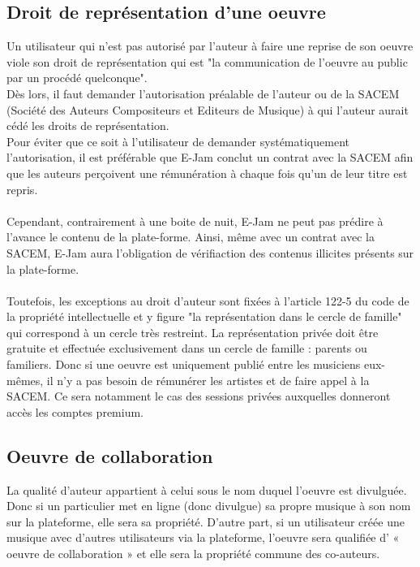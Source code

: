 \documentclass[a4,12pt]{article}
\begin{document}
\subsection{Droit de représentation d'une oeuvre}

Un utilisateur qui n'est pas autorisé par l'auteur à faire une reprise de son oeuvre viole son droit de représentation qui est "la communication de l'oeuvre au public par un procédé quelconque".\\
Dès lors, il faut demander l'autorisation préalable de l'auteur ou de la SACEM (Société des Auteurs Compositeurs et Editeurs de Musique) à qui l'auteur aurait cédé les droits de représentation.\\
Pour éviter que ce soit à l'utilisateur de demander systématiquement l'autorisation, il est préférable que E-Jam conclut un contrat avec la SACEM afin que les auteurs perçoivent une rémunération à chaque fois qu'un de leur titre est repris.\\
\\
Cependant, contrairement à une boite de nuit, E-Jam ne peut pas prédire à l'avance le contenu de la plate-forme. Ainsi, même avec un contrat avec la SACEM, E-Jam aura l'obligation de vérifiaction des contenus illicites présents sur la plate-forme.\\
\\
Toutefois, les exceptions au droit d'auteur sont fixées à l'article 122-5 du code de la propriété intellectuelle et y figure "la représentation dans le cercle de famille" qui correspond à un cercle très restreint. La représentation privée doit être gratuite et effectuée exclusivement dans un cercle de famille : parents ou familiers. Donc si une oeuvre est uniquement publié entre les musiciens eux-mêmes, il n'y a pas besoin de rémunérer les artistes et de faire appel à la SACEM. Ce sera notamment le cas des sessions privées auxquelles donneront accès les comptes premium.

\subsection{Oeuvre de collaboration}

La qualité d’auteur appartient à celui sous le nom duquel l’oeuvre est divulguée.\\
Donc si un particulier met en ligne (donc divulgue) sa propre musique à son nom sur la plateforme, elle sera sa propriété. D’autre part, si un utilisateur créée une musique avec d’autres utilisateurs via la plateforme, l’oeuvre sera qualifiée d’ « oeuvre de collaboration » et elle sera la propriété commune des co-auteurs.
\end{document}
